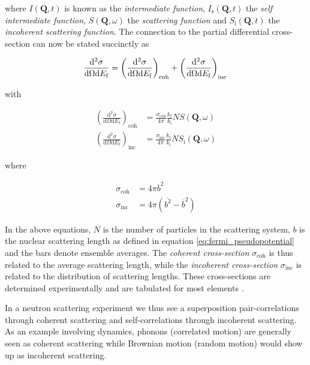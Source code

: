 \noindent where $I(\bm{Q}, t)$ is known as the \emph{intermediate function}, $I_\text{s}(\bm{Q}, t)$ the \emph{self intermediate function}, $S(\bm{Q}, \omega)$ the \emph{scattering function} and $S_\text{i}(\bm{Q}, t)$ the \emph{incoherent scattering function}. The connection to the partial differential cross-section can now be stated succinctly as

\begin{equation}
	\frac{\mathrm{d}^2\sigma}{\mathrm{d}\Omega\mathrm{d}E_\text{f}} = \left( \frac{\mathrm{d}^2\sigma}{\mathrm{d}\Omega\mathrm{d}E_\text{f}} \right)_\text{coh} + \left( \frac{\mathrm{d}^2\sigma}{\mathrm{d}\Omega\mathrm{d}E_\text{f}} \right)_\text{inc} \\
\end{equation}

\noindent with

\begin{align*}
	\left( \frac{\mathrm{d}^2\sigma}{\mathrm{d}\Omega\mathrm{d}E_\text{f}} \right)_\text{coh} &= \frac{\sigma_\text{coh}}{4\pi}\frac{k_\text{f}}{k_\text{i}}N S(\bm{Q}, \omega) \\ 
	\left( \frac{\mathrm{d}^2\sigma}{\mathrm{d}\Omega\mathrm{d}E_\text{f}} \right)_\text{inc} &= \frac{\sigma_\text{inc}}{4\pi}\frac{k_\text{f}}{k_\text{i}}N S_\text{i}(\bm{Q}, \omega)
\end{align*}

\noindent where

\begin{align*}
	\sigma_\text{coh} &= 4 \pi \overline{b}^2 \\
	\sigma_\text{inc} &= 4 \pi \left( \overline{b^2} - \overline{b}^2 \right)
\end{align*}

\noindent In the above equations, $N$ is the number of particles in the scattering system, $b$ is the nuclear scattering length as defined in equation \eqref{eq:fermi_pseudopotential} and the bars denote ensemble averages. The \emph{coherent cross-section} $\sigma_\text{coh}$ is thus related to the average scattering length, while the \emph{incoherent cross-section} $\sigma_\text{inc}$ is related to the distribution of scattering lengths. These cross-sections are determined experimentally and are tabulated for most elements \cite{nist}.

In a neutron scattering experiment we thus see a superposition pair-correlations through coherent scattering and self-correlations through incoherent scattering. As an example involving dynamics, phonons (correlated motion) are generally seen as coherent scattering while Brownian motion (random motion) would show up as incoherent scattering.

